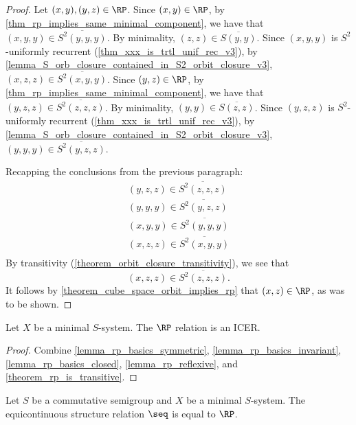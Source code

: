 \begin{proof}
\leanok{}
    Let $(x,y), (y,z) \in \RP$.  Since $(x,y) \in \RP$, by \cref{thm_rp_implies_same_minimal_component}, we have that $(x,y,y) \in \overline{S^2(y,y,y)}$.  By minimality, $(z,z) \in \overline{S(y,y)}$.  Since $(x,y,y)$ is $S^2$-uniformly recurrent (\cref{thm_xxx_is_trtl_unif_rec_v3}), by \cref{lemma_S_orb_closure_contained_in_S2_orbit_closure_v3}, $(x,z,z) \in \overline{S^2(x,y,y)}$.  Since $(y,z) \in \RP$, by \cref{thm_rp_implies_same_minimal_component}, we have that $(y,z,z) \in \overline{S^2(z,z,z)}$.  By minimality, $(y,y) \in \overline{S(z,z)}$.  Since $(y,z,z)$ is $S^2$-uniformly recurrent (\cref{thm_xxx_is_trtl_unif_rec_v3}), by \cref{lemma_S_orb_closure_contained_in_S2_orbit_closure_v3}, $(y,y,y) \in \overline{S^2(y,z,z)}$.
    
    Recapping the conclusions from the previous paragraph:
    \begin{align*}
        (y,z,z) \in \overline{S^2(z,z,z)}\\
        (y,y,y) \in \overline{S^2(y,z,z)}\\
        (x,y,y) \in \overline{S^2(y,y,y)}\\
        (x,z,z) \in \overline{S^2(x,y,y)}\\
    \end{align*}
    By transitivity (\cref{theorem_orbit_closure_transitivity}), we see that
    \[(x,z,z) \in \overline{S^2(z,z,z)}.\]
    It follows by \cref{theorem_cube_space_orbit_implies_rp} that $(x,z) \in \RP$, as was to be shown.
\end{proof}

\begin{theorem}
\label{theorem_rp_is_ICER}
\leanok{}
    Let $X$ be a minimal $S$-system.  The $\RP$ relation is an ICER.
\end{theorem}

\begin{proof}
\leanok{}
    Combine \cref{lemma_rp_basics_symmetric}, \cref{lemma_rp_basics_invariant}, \cref{lemma_rp_basics_closed}, \cref{lemma_rp_reflexive}, and \cref{theorem_rp_is_transitive}.
\end{proof}

\begin{theorem}
\label{thm_rp_equals_s}
\leanok{}
    Let $S$ be a commutative semigroup and $X$ be a minimal $S$-system.  The equicontinuous structure relation $\seq$ is equal to $\RP$.
\end{theorem}

